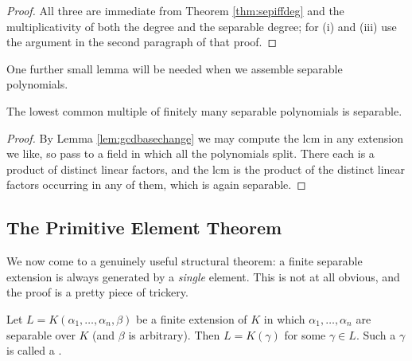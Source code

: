 \begin{proof}
	All three are immediate from Theorem \ref{thm:sepiffdeg} and the multiplicativity of both the degree and the separable degree; for (i) and (iii) use the argument in the second paragraph of that proof.
\end{proof}

One further small lemma will be needed when we assemble separable polynomials.

\begin{lemma}\label{lem:lcmsep}
	The lowest common multiple of finitely many separable polynomials is separable.
\end{lemma}

\begin{proof}
	By Lemma \ref{lem:gcdbasechange} we may compute the lcm in any extension we like, so pass to a field in which all the polynomials split. There each is a product of distinct linear factors, and the lcm is the product of the distinct linear factors occurring in any of them, which is again separable.
\end{proof}

\subsection{The Primitive Element Theorem}

We now come to a genuinely useful structural theorem: a finite separable extension is always generated by a \emph{single} element. This is not at all obvious, and the proof is a pretty piece of trickery.

\begin{theorem}\label{thm:pet}
	Let $L = K(\alpha_1, \dots, \alpha_n, \beta)$ be a finite extension of $K$ in which $\alpha_1, \dots, \alpha_n$ are separable over $K$ (and $\beta$ is arbitrary). Then $L = K(\gamma)$ for some $\gamma \in L$. Such a $\gamma$ is called a .
\end{theorem}

